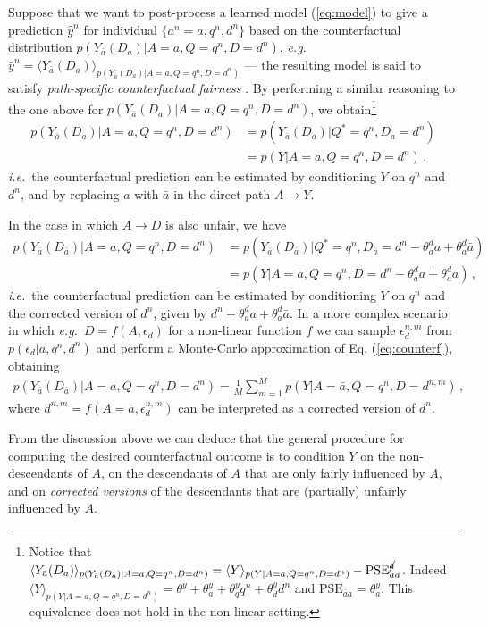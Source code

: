 \documentclass[runningheads]{llncs}
\renewcommand{\eqref}[1]{Eq. (\ref{#1})}
\newcommand{\av}[1]{\langle #1 \rangle}
\newcommand{\ie}{\emph{i.e.}}
\newcommand{\eg}{\emph{e.g.}}
\begin{document}
Suppose that we want to post-process a learned model (\ref{eq:model}) to give a prediction $\hat y^n$ for  individual $\{a^n=a, q^n, d^n\}$ based on the counterfactual distribution $p(Y_{\bar a}(D_a)|A=a, Q=q^n, D=d^n)$, \eg~$\hat y^n=\av{Y_{\bar a}(D_a)}_{p(Y_{\bar a}(D_a)|A=a, Q=q^n, D=d^n)}$ --- the resulting model is said to satisfy \emph{path-specific counterfactual fairness} \cite{chiappa19path}. 
By performing a similar reasoning to the one above for $p(Y_{\bar a}(D_a)|A=a, Q=q^n, D=d^n)$, we obtain\footnote{Notice that 
$\av{Y_{\bar a}(D_a)}_{p(Y_{\bar a}(D_a)|A=a, Q=q^n, D=d^n)} = \av{Y}_{p(Y|A=a, Q=q^n, D=d^n)}-\textrm{PSE}^{\cancel{a}}_{\bar a a}$. Indeed $\av{Y}_{p(Y|A=a, Q=q^n, D=d^n)}=\theta^y+\theta^y_{a}+\theta^y_{q}q^n+\theta^y_{d}d^n$ and $\textrm{PSE}_{\bar a a}=\theta^y_a$.
This equivalence does not hold in the non-linear setting.}
\begin{align*}
p(Y_{\bar a}(D_a)|A=a, Q=q^n, D=d^n)&=p(Y_{\bar a}(D_a)| Q^*=q^n, D_a=d^n)\\
&=p(Y| A=\bar a, Q=q^n, D=d^n)\,,
\end{align*}
\ie~the counterfactual prediction can be estimated by conditioning $Y$ on $q^n$ and $d^n$, and by replacing $a$ with $\bar a$ in the direct path $A\rightarrow Y$. 

In the case in which $A\rightarrow D$ is also unfair, we have
\begin{align*}
p(Y_{\bar a}(D_{\bar a})|A=a, Q=q^n, D=d^n)&=p(Y_{\bar a}(D_{\bar a})| Q^*=q^n, D_{\bar a}=d^n-\theta^d_aa+\theta^d_a \bar a)\\
&=p(Y| A=\bar a,Q=q^n, D=d^n-\theta^d_aa+\theta^d_a \bar a)\,,
\end{align*}
\ie~the counterfactual prediction can be estimated by conditioning $Y$ on $q^n$ and the corrected version of $d^n$, given by $d^n-\theta^d_aa+\theta^d_a \bar a$. In a more complex scenario in which \eg~$D=f(A, \epsilon _d)$ for a non-linear function $f$ we can sample $\epsilon^{n,m}_d$ from $p(\epsilon_d|a, q^n, d^n)$ and perform a Monte-Carlo approximation of \eqref{eq:counterf}, obtaining
\begin{align*}
p(Y_{\bar a}(D_{\bar a})|A=a, Q=q^n, D=d^n)=\frac{1}{M}\sum_{m=1}^M p(Y| A=\bar a, Q=q^n, D=d^{n,m})\,,
\end{align*}
where $d^{n,m}=f(A=\bar a, \epsilon^{n,m}_d)$ can be interpreted as a corrected version of $d^n$. 

From the discussion above we can deduce that the general procedure for computing the desired counterfactual outcome is to condition $Y$ on the non-descendants of $A$, on the descendants of $A$ that are only fairly influenced by $A$, and on \emph{corrected versions} of the descendants that are (partially) unfairly influenced by $A$. 
\end{document}
